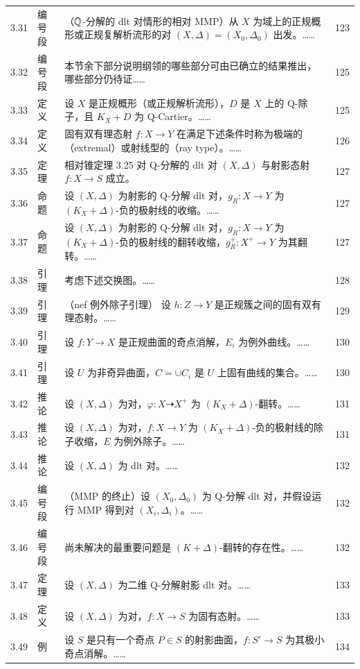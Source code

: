 \begin{longtable}{@{}p{}p{}p{}p{}@{}}
3.31 & 编号段 & （$\mathbb{Q}$-分解的 dlt 对情形的相对 MMP）\quad 从 $X$ 为域上的正规概形或正规复解析流形的对 $(X,\Delta)=(X_0,\Delta_0)$ 出发。…… & 123 \\
3.32 & 编号段 & 本节余下部分说明纲领的哪些部分可由已确立的结果推出，哪些部分仍待证…… & 125 \\
3.33 & 定义 & 设 $X$ 是正规概形（或正规解析流形），$D$ 是 $X$ 上的 Q-除子，且 $K_X+D$ 为 Q-Cartier。…… & 125 \\
3.34 & 定义 & 固有双有理态射 $f:X\to Y$ 在满足下述条件时称为极端的（extremal）或射线型的（ray type）。…… & 126 \\
3.35 & 定理 & 相对锥定理 3.25 对 Q-分解的 dlt 对 $(X,\Delta)$ 与射影态射 $f:X\to S$ 成立。 & 127 \\
3.36 & 命题 & 设 $(X,\Delta)$ 为射影的 Q-分解 dlt 对，$g_R:X\to Y$ 为 $(K_X+\Delta)$-负的极射线的收缩。…… & 127 \\
3.37 & 命题 & 设 $(X,\Delta)$ 为射影的 Q-分解 dlt 对，$g_R:X\to Y$ 为 $(K_X+\Delta)$-负的极射线的翻转收缩，$g_R^{+}:X^{+}\to Y$ 为其翻转。…… & 127 \\
3.38 & 引理 & 考虑下述交换图。…… & 128 \\
3.39 & 引理 & （nef 例外除子引理） 设 $h:Z\to Y$ 是正规簇之间的固有双有理态射。…… & 129 \\
3.40 & 引理 & 设 $f:Y\to X$ 是正规曲面的奇点消解，$E_i$ 为例外曲线。…… & 130 \\
3.41 & 引理 & 设 $U$ 为非奇异曲面，$C=\cup C_i$ 是 $U$ 上固有曲线的集合。…… & 130 \\
3.42 & 推论 & 设 $(X,\Delta)$ 为对，$\varphi:X\dashrightarrow X^{+}$ 为 $(K_X+\Delta)$-翻转。…… & 131 \\
3.43 & 推论 & 设 $(X,\Delta)$ 为对，$f:X\to Y$ 为 $(K_X+\Delta)$-负的极射线的除子收缩，$E$ 为例外除子。…… & 131 \\
3.44 & 推论 & 设 $(X,\Delta)$ 为 dlt 对。…… & 132 \\
3.45 & 编号段 & （MMP 的终止）\quad 设 $(X_0,\Delta_0)$ 为 Q-分解 dlt 对，并假设运行 MMP 得到对 $(X_i,\Delta_i)$。…… & 132 \\
3.46 & 编号段 & 尚未解决的最重要问题是 $(K+\Delta)$-翻转的存在性。…… & 132 \\
3.47 & 定理 & 设 $(X,\Delta)$ 为二维 Q-分解射影 dlt 对。…… & 133 \\
3.48 & 定义 & 设 $(X,\Delta)$ 为对，$f:X\to S$ 为固有态射。…… & 133 \\
3.49 & 例 & 设 $S$ 是只有一个奇点 $P\in S$ 的射影曲面，$f:S'\to S$ 为其极小奇点消解。…… & 134 \\

\end{longtable}
